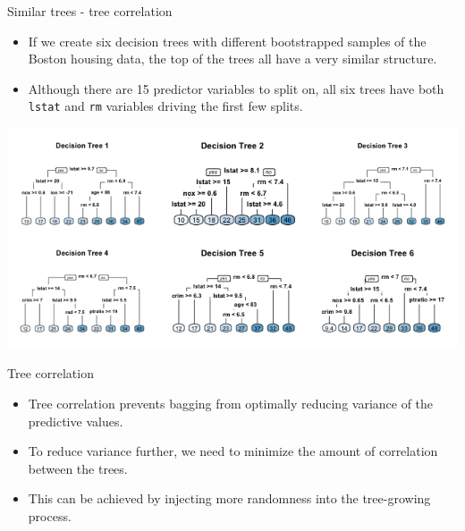 \documentclass[
  10pt,
  ignorenonframetext,
]{beamer}
\providecommand{\tightlist}{%
  \setlength{\itemsep}{0pt}\setlength{\parskip}{0pt}}
\begin{document}
\begin{frame}[fragile]{Similar trees - tree correlation}
\protect\hypertarget{similar-trees---tree-correlation}{}

\begin{itemize}
\tightlist
\item
  If we create six decision trees with different bootstrapped samples of
  the Boston housing data, the top of the trees all have a very similar
  structure.
\item
  Although there are 15 predictor variables to split on, all six trees
  have both \texttt{lstat} and \texttt{rm} variables driving the first
  few splits.
\end{itemize}

\includegraphics{figure/tree-correlation-1.png}

\end{frame}

\begin{frame}{Tree correlation}
\protect\hypertarget{tree-correlation}{}

\begin{itemize}
\tightlist
\item
  Tree correlation prevents bagging from optimally reducing variance of
  the predictive values.
\item
  To reduce variance further, we need to minimize the amount of
  correlation between the trees.
\item
  This can be achieved by injecting more randomness into the
  tree-growing process.
\end{itemize}

\end{frame}
\end{document}
